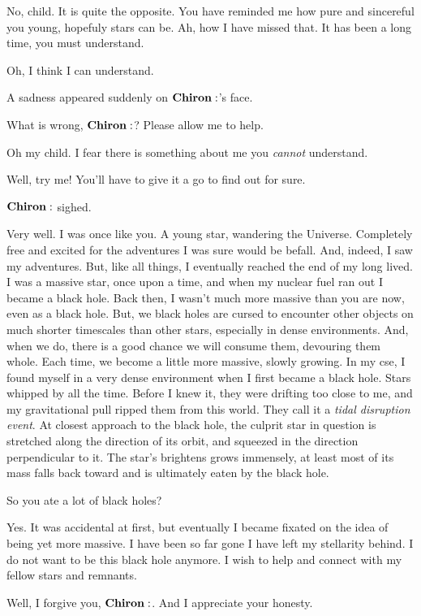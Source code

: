 \documentclass[main.tex]{subfiles}
\begin{document}
\Chiron No, child.  It is quite the opposite.  You have reminded me how pure and sincereful you young, hopefuly stars can be.  Ah, how I have missed that.  It has been a long time, you must understand.  

\Electra Oh, I think I can understand.

A sadness appeared suddenly on $\Chiron$'s face.

\Electra What is wrong, $\Chiron$?  Please allow me to help.

\Chiron Oh my child.  I fear there is something about me you \textit{cannot} understand.

\Electra Well, try me!  You'll have to give it a go to find out for sure.

$\Chiron$ sighed.

\Chiron Very well.  I was once like you.  A young star, wandering the Universe.  Completely free and excited for the adventures I was sure would be befall.  And, indeed, I saw my adventures.  But, like all things, I eventually reached the end of my long lived.  I was a massive star, once upon a time, and when my nuclear fuel ran out I became a black hole.  Back then, I wasn't much more massive than you are now, even as a black hole.  But, we black holes are cursed to encounter other objects on much shorter timescales than other stars, especially in dense environments.  And, when we do, there is a good chance we will consume them, devouring them whole.  Each time, we become a little more massive, slowly growing.  In my cse, I found myself in a very dense environment when I first became a black hole.  Stars whipped by all the time.  Before I knew it, they were drifting too close to me, and my gravitational pull ripped them from this world.  They call it a \textit{tidal disruption event}.  At closest approach to the black hole, the culprit star in question is stretched along the direction of its orbit, and squeezed in the direction perpendicular to it.  The star's brightens grows immensely, at least most of its mass falls back toward and is ultimately eaten by the black hole.  

\Electra So you ate a lot of black holes?

\Chiron Yes.  It was accidental at first, but eventually I became fixated on the idea of being yet more massive.  I have been so far gone I have left my stellarity behind.  I do not want to be this black hole anymore.  I wish to help and connect with my fellow stars and remnants.  

\Electra Well, I forgive you, $\Chiron$.  And I appreciate your honesty.
\end{document}
